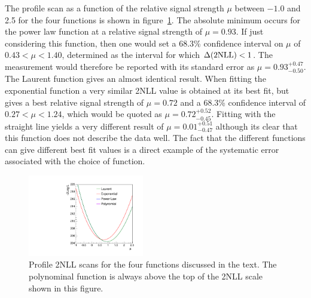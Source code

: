 The profile scan as a function of the relative signal strength $\mu$
between $-1.0$ and 2.5
for the four functions is shown in
figure~\ref{fig:functions:profiles}.
The absolute minimum occurs for the power law function at a relative signal 
strength of $\mu = 0.93$. If just considering this function,
then one would set a 68.3\% confidence interval on $\mu$ of  
$0.43 < \mu < 1.40 $, determined as the interval for which $\Delta({\rm 2NLL}) < 1$. 
The measurement would therefore be reported with its standard error as $\mu=0.93^{+0.47}_{-0.50}$. The Laurent function gives an almost identical result.
When fitting the exponential function a very similar 2NLL value is obtained
at its best fit, but gives a best relative signal strength of $\mu = 0.72$
and a 68.3\% confidence interval of
$0.27 < \mu < 1.24 $, which would be quoted as $\mu = 0.72^{+0.52}_{-0.45}$.
Fitting with the straight line yields a very different result of 
$\mu = 0.01^{+0.51}_{-0.47}$ 
although its clear that this function does not describe the data well.
The fact that the different functions can give different best fit values
is a direct example of the systematic error associated
with the choice of function.
%
\begin{figure}[tbp]
\centering
\includegraphics[width=0.45\textwidth]{functions/Profiles.pdf}
\caption{Profile 2NLL scans for the four functions discussed in the text.
The polynominal function is always above the top of the 2NLL scale shown in this
figure. }
\label{fig:functions:profiles}
\end{figure}

